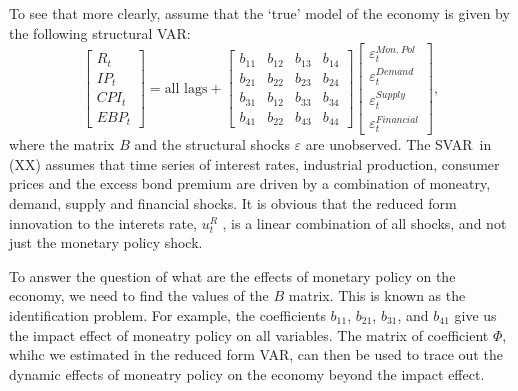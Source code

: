 \documentclass[10pt]{article}
\begin{document}
To see that more clearly, assume that the `true' model of the economy is
given by the following structural VAR:%
\begin{equation}
\begin{bmatrix}
R_{t} \\ 
IP_{t} \\ 
CPI_{t} \\ 
EBP_{t}%
\end{bmatrix}%
=\text{all lags}+\left[ 
\begin{array}{cccc}
b_{11} & b_{12} & b_{13} & b_{14} \\ 
b_{21} & b_{22} & b_{23} & b_{24} \\ 
b_{31} & b_{12} & b_{33} & b_{34} \\ 
b_{41} & b_{22} & b_{43} & b_{44}%
\end{array}%
\right] 
\begin{bmatrix}
\varepsilon _{t}^{Mon.\ Pol} \\ 
\varepsilon _{t}^{Demand} \\ 
\varepsilon _{t}^{Supply} \\ 
\varepsilon _{t}^{Financial}%
\end{bmatrix}%
,  \label{eq:GK_VAR}
\end{equation}%
where the matrix $B$ and the structural shocks $\varepsilon $ are
unobserved. The SVAR\ in (XX) assumes that time series of interest rates,
industrial production, consumer prices and the excess bond premium are
driven by a combination of moneatry, demand, supply and financial shocks. It
is obvious that the reduced form innovation to the interets rate, $u_{t}^{R}$%
, is a linear combination of all shocks, and not just the monetary policy
shock.

To answer the question of what are the effects of monetary policy on the
economy, we need to find the values of the $B$ matrix. This is known as the
identification problem. For example, the coefficients $b_{11}$, $b_{21}$, $%
b_{31}$, and $b_{41}$ give us the impact effect of moneatry policy on all
variables. The matrix of coefficient $\Phi $, whihc we estimated in the
reduced form VAR, can then be used to trace out the dynamic effects of
moneatry policy on the economy beyond the impact effect.
\end{document}
